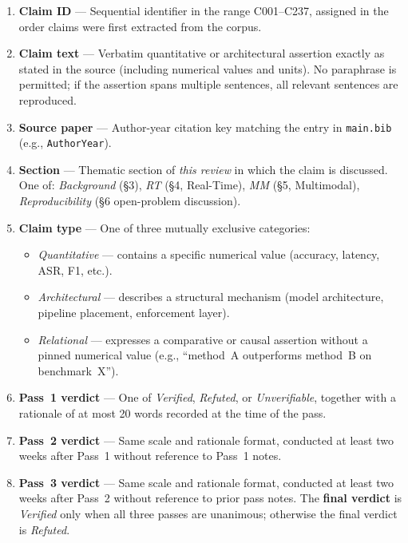 \begin{enumerate}
  \item \textbf{Claim ID} — Sequential identifier in the range C001–C237,
        assigned in the order claims were first extracted from the corpus.

  \item \textbf{Claim text} — Verbatim quantitative or architectural
        assertion exactly as stated in the source (including numerical values
        and units). No paraphrase is permitted; if the assertion spans
        multiple sentences, all relevant sentences are reproduced.

  \item \textbf{Source paper} — Author-year citation key matching the entry
        in \texttt{main.bib} (e.g., \texttt{AuthorYear}).

  \item \textbf{Section} — Thematic section of \emph{this review} in which
        the claim is discussed. One of:
        \textit{Background} (§3),
        \textit{RT} (§4, Real-Time),
        \textit{MM} (§5, Multimodal),
        \textit{Reproducibility} (§6 open-problem discussion).

  \item \textbf{Claim type} — One of three mutually exclusive categories:
        \begin{itemize}
          \item \textit{Quantitative} — contains a specific numerical value
                (accuracy, latency, ASR, F1, etc.).
          \item \textit{Architectural} — describes a structural mechanism
                (model architecture, pipeline placement, enforcement layer).
          \item \textit{Relational} — expresses a comparative or causal
                assertion without a pinned numerical value (e.g.,
                ``method~A outperforms method~B on benchmark~X'').
        \end{itemize}

  \item \textbf{Pass~1 verdict} — One of \textit{Verified},
        \textit{Refuted}, or \textit{Unverifiable}, together with a
        rationale of at most 20 words recorded at the time of the pass.

  \item \textbf{Pass~2 verdict} — Same scale and rationale format,
        conducted at least two weeks after Pass~1 without reference to
        Pass~1 notes.

  \item \textbf{Pass~3 verdict} — Same scale and rationale format,
        conducted at least two weeks after Pass~2 without reference to
        prior pass notes.
        The \textbf{final verdict} is \textit{Verified} only when all
        three passes are unanimous; otherwise the final verdict is
        \textit{Refuted}.
\end{enumerate}

